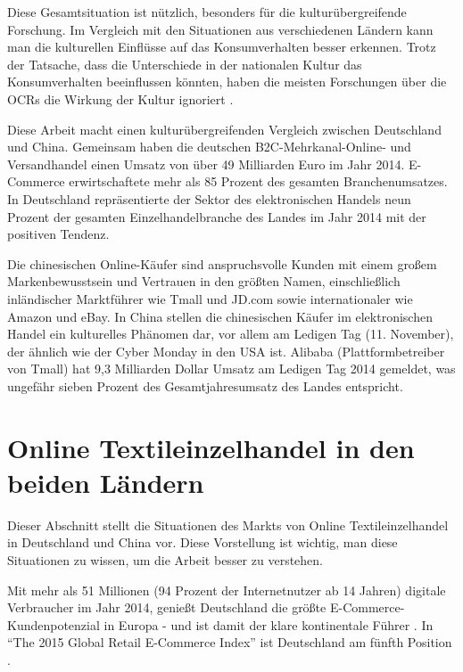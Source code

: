 Diese Gesamtsituation ist nützlich, besonders für die kulturübergreifende Forschung. Im Vergleich mit den Situationen aus verschiedenen Ländern kann man die kulturellen Einflüsse auf das Konsumverhalten besser erkennen. Trotz der Tatsache, dass die Unterschiede in der nationalen Kultur das Konsumverhalten beeinflussen könnten, haben die meisten Forschungen über die \ac{OCRs} die Wirkung der Kultur ignoriert \citep{gefen2006need}.

Diese Arbeit macht einen kulturübergreifenden Vergleich zwischen Deutschland und China. Gemeinsam haben die deutschen \acs{B2C}-Mehrkanal-Online- und Versandhandel einen Umsatz von über 49 Milliarden Euro im Jahr 2014. E-Commerce erwirtschaftete mehr als 85 Prozent des gesamten Branchenumsatzes. In Deutschland repräsentierte der Sektor des elektronischen Handels neun Prozent der gesamten Einzelhandelbranche des Landes im Jahr 2014 mit der positiven Tendenz. \citep{Spath2015}

Die chinesischen Online-Käufer sind anspruchsvolle Kunden mit einem großem Markenbewusstsein und Vertrauen in den größten Namen, einschließlich inländischer Marktführer wie Tmall und JD.com sowie internationaler wie Amazon und eBay. In China stellen die chinesischen Käufer im elektronischen Handel ein kulturelles Phänomen dar, vor allem am Ledigen Tag (11. November), der ähnlich wie der Cyber Monday in den USA ist. Alibaba (Plattformbetreiber von Tmall) hat 9,3 Milliarden Dollar Umsatz am Ledigen Tag 2014 gemeldet, was ungefähr sieben Prozent des Gesamtjahresumsatz des Landes entspricht. \citep{HanaBen-Shabat2015}
\section{Online Textileinzelhandel in den beiden Ländern} \label{sec:online_kleidung}
Dieser Abschnitt stellt die Situationen des Markts von Online Textileinzelhandel in Deutschland und China vor. Diese Vorstellung ist wichtig, man diese Situationen zu wissen, um die Arbeit besser zu verstehen.

Mit mehr als 51 Millionen (94 Prozent der Internetnutzer ab 14 Jahren) digitale Verbraucher im Jahr 2014, genießt Deutschland die größte E-Commerce-Kundenpotenzial in Europa - und ist damit der klare kontinentale Führer \citep{Spath2015}. In ``The 2015 Global Retail E-Commerce Index'' ist Deutschland am fünfth Position \citep{HanaBen-Shabat2015}. 

